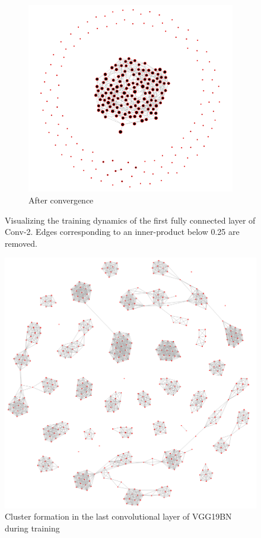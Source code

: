 \begin{figure}[H]
\begin{subfigure}[b]{0.62\textwidth}
   \includegraphics[width=\linewidth]{images/conv2-fc1-final.png}
   \caption{After convergence}
   \label{fig:conv2-fc1-final}
\end{subfigure}
\caption{Visualizing the training dynamics of the first fully connected layer of Conv-2. Edges corresponding to an inner-product below 0.25 are removed.}
\end{figure}

\begin{figure}[H]
\centering
	\includegraphics[scale=0.3]{images/vgg-conv16-final.png}
\caption{Cluster formation in the last convolutional layer of VGG19BN during training}
\label{fig:vgg-conv16-final} 
\end{figure}

